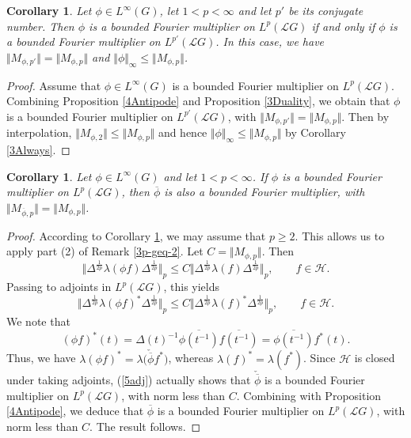 \documentclass[12pt]{amsart}
\renewcommand{\H}{\mbox{${\mathcal H}$}}
\newcommand{\norm}[1]{\Vert#1\Vert}
\newcommand{\bignorm}[1]{\bigl\Vert#1\bigr\Vert}
\newtheorem{corollary}[theorem]{Corollary}
\theoremstyle{remark}
\theoremstyle{definition}
\numberwithin{equation}{section}
\begin{document}
\begin{corollary}\label{5SelfDual}
Let $\phi\in L^\infty(G)$, let $1< p<\infty$ and let $p'$ be its conjugate number. 
Then $\phi$ is a bounded Fourier multiplier on
$L^p({\mathcal L}G)$ if and only if $\phi$ is a bounded Fourier multiplier on
$L^{p'}({\mathcal L}G)$. In this case, we
have $\norm{M_{\phi,p'}}=\norm{M_{\phi,p}}$ and $\norm{\phi}_\infty\leq \norm{M_{\phi,p}}$.
\end{corollary}


\begin{proof}
Assume that $\phi\in L^\infty(G)$
is a bounded Fourier multiplier on
$L^p({\mathcal L}G)$.
Combining Proposition \ref{4Antipode} and Proposition \ref{3Duality}, we obtain
that $\phi$ is a bounded Fourier multiplier on
$L^{p'}({\mathcal L}G)$, with $\norm{M_{\phi,p'}}=\norm{M_{\phi,p}}$. 
Then by interpolation,
$\norm{M_{\phi,2}}\leq \norm{M_{\phi,p}}$ and hence 
$\norm{\phi}_\infty\leq \norm{M_{\phi,p}}$
by Corollary \ref{3Always}.
\end{proof}




\begin{corollary}\label{5Bar}
Let $\phi\in L^\infty(G)$ and let $1< p<\infty$.
If $\phi$ is a bounded Fourier multiplier on
$L^p({\mathcal L}G)$, then $\overline{\phi}$ is also 
a bounded Fourier multiplier, with 
$\norm{M_{\overline{\phi},p}} = \norm{M_{\phi,p}}$.
\end{corollary}

\begin{proof}
According to Corollary \ref{5SelfDual}, we may assume that
$p\geq 2$. This allows us to apply part (2) of Remark
\ref{3p-geq-2}. Let $C=\norm{M_{\phi,p}}$. Then
$$
\bignorm{\Delta^{\frac{1}{2p}}\lambda(\phi f)\Delta^{\frac{1}{2p}}}_p\leq C
\bignorm{\Delta^{\frac{1}{2p}}\lambda(f)\Delta^{\frac{1}{2p}}}_p,\qquad f\in\H.
$$
Passing to adjoints in $L^p({\mathcal L}G)$, 
this yields
\begin{equation}\label{5adj}
\bignorm{\Delta^{\frac{1}{2p}}\lambda(\phi f)^*\Delta^{\frac{1}{2p}}}_p\leq C
\bignorm{\Delta^{\frac{1}{2p}}\lambda(f)^*\Delta^{\frac{1}{2p}}}_p,\qquad f\in\H.
\end{equation}
We note that
$$
(\phi f)^*(t) = \Delta(t)^{-1}\overline{\phi(t^{-1})}
\overline{f(t^{-1})} = \overline{\phi(t^{-1})} f^*(t).
$$
Thus, we have $\lambda(\phi f)^* = \lambda\bigl(\check{\overline{\phi}}f^*\bigr)$, whereas
$\lambda(f)^* = \lambda(f^*)$. Since $\H$ is closed under taking adjoints,
(\ref{5adj}) actually shows that
$\check{\overline{\phi}}$ is a bounded 
Fourier multiplier on $L^p({\mathcal L}G)$, with norm
less than $C$. Combining with Proposition \ref{4Antipode}, 
we deduce that $\overline{\phi}$ is a bounded 
Fourier multiplier on $L^p({\mathcal L}G)$, with norm
less than $C$. The result follows.
\end{proof}
\end{document}
